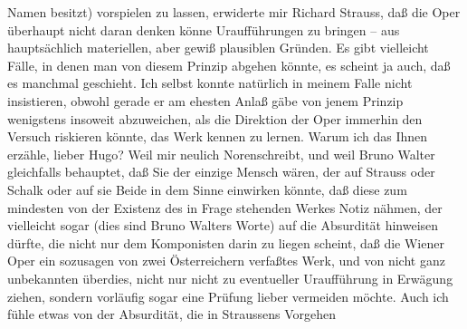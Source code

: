 \begin{ledgroupsized}[t]{13cm}
               Namen besitzt) vorspielen zu lassen, erwiderte mir Richard Strauss, daß die Oper überhaupt
               nicht daran denken könne Uraufführungen zu bringen – aus hauptsächlich materiellen,
               aber gewiß plausiblen Gründen. Es gibt vielleicht Fälle, in denen man von diesem
               Prinzip abgehen könnte, es scheint ja auch, daß es manchmal geschieht. Ich selbst
               konnte natürlich in meinem Falle nicht insistieren, obwohl gerade er am ehesten Anlaß
               gäbe von jenem Prinzip wenigstens insoweit abzuweichen, als die Direktion der Oper immerhin den Versuch riskieren könnte, das Werk
               kennen zu lernen. Warum ich das Ihnen erzähle, lieber Hugo? Weil mir neulich Norenschreibt, und weil Bruno Walter gleichfalls behauptet, daß Sie der einzige Mensch wären, der
               auf Strauss oder Schalk oder auf sie Beide in dem Sinne einwirken könnte, daß diese zum
               mindesten von der Existenz des in Frage stehenden Werkes Notiz nähmen, der vielleicht
               sogar (dies sind Bruno Walters Worte) auf die
               Absurdität hinweisen dürfte, die nicht nur dem Komponisten darin zu liegen scheint,
               daß die Wiener Oper ein sozusagen von zwei Österreichern verfaßtes Werk, und von nicht ganz
               unbekannten überdies, nicht nur nicht zu eventueller Uraufführung in Erwägung ziehen,
               sondern vorläufig sogar eine Prüfung lieber vermeiden möchte. Auch ich fühle etwas
               von der Absurdität, die in Straussens Vorgehen

\end{ledgroupsized}
